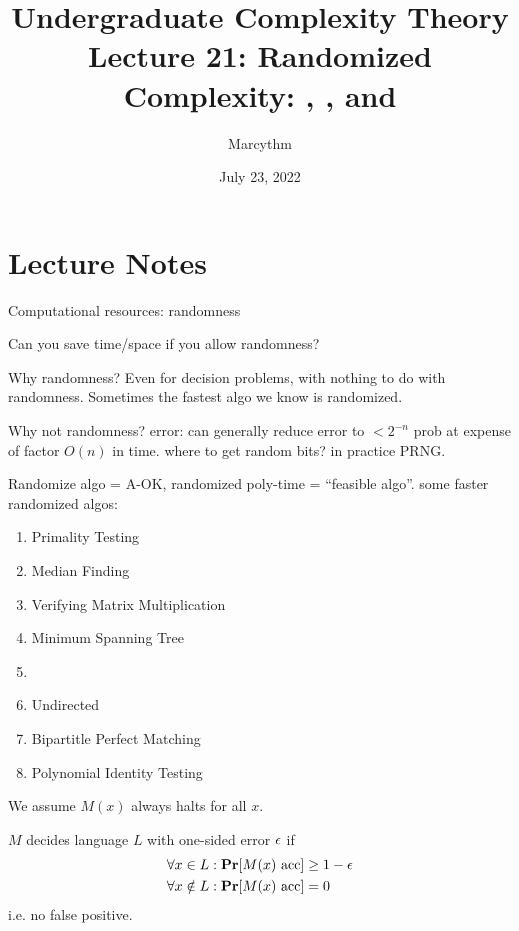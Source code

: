 \documentclass{article}
\title{Undergraduate Complexity Theory \\ Lecture 21: Randomized Complexity: \RP, \coRP, and \ZPP}
\author{Marcythm}
\date{July 23, 2022}
\begin{document}
\maketitle{}

\section{Lecture Notes}

Computational resources: randomness

Can you save time/space if you allow randomness?

Why randomness? Even for decision problems, with nothing to do with randomness. Sometimes the fastest algo we know is randomized.

Why not randomness?
error: can generally reduce error to \(< 2^{-n}\) prob at expense of factor \(O(n)\) in time.
where to get random bits? in practice PRNG.

Randomize algo = A-OK, randomized poly-time = ``feasible algo''. some faster randomized algos:

\begin{enumerate}
  \item Primality Testing
  \item Median Finding
  \item Verifying Matrix Multiplication
  \item Minimum Spanning Tree
  \item {}
  \item Undirected 
  \item Bipartitle Perfect Matching
  \item Polynomial Identity Testing
\end{enumerate}


\begin{remark}
  We assume \(M(x)\) always halts for all \(x\).
\end{remark}

\begin{definition}
  \(M\) decides language \(L\) with one-sided error \(\epsilon\) if
  \[ \begin{aligned}
    \forall x \in L: \mathop{\bf Pr\/}\lbrack\text{\(M(x)\) acc}\rbrack &\geq 1 - \epsilon \\
    \forall x \notin L: \mathop{\bf Pr\/}\lbrack\text{\(M(x)\) acc}\rbrack &= 0
  \end{aligned} \]
  i.e. no false positive.
\end{definition}
\end{document}
